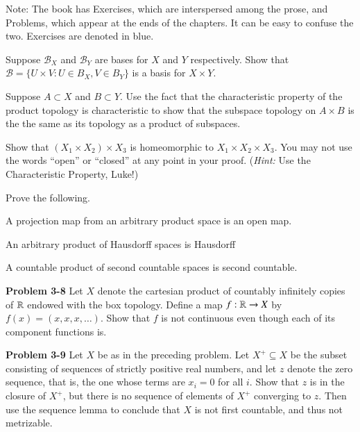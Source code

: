 \documentclass[minion]{homework651}
\begin{document}
Note: The book has Exercises, which are interspersed among the
prose, and Problems, which appear at the ends of the chapters.
It can be easy to confuse the two.  Exercises are denoted in blue.


\begin{problems}

\problem Suppose $\mathcal B_X$ and $\mathcal B_Y$ are bases for $X$ and $Y$ respectively.
Show that $\mathcal B = \{U\times V: U\in B_X, V\in B_Y\}$ is a basis for $X\times Y$.

\problem Suppose $A\subset X$ and $B\subset Y$.  Use the fact that
the characteristic property of the product topology is characteristic to
show that the subspace topology on $A\times B$ is the the same as its
topology as a product of subspaces.





\problem Show that $(X_1\times X_2)\times X_3$ is homeomorphic to $X_1\times X_2 \times X_3$.
You may not use the words ``open'' or ``closed'' at any point in your proof.  (\textit{Hint:} Use the Characteristic Property, Luke!)


\problem Prove the following.
\begin{subproblems}

\item A projection map from an arbitrary product space is an open map.

\item An arbitrary product of Hausdorff spaces is Hausdorff

\item A countable product of second countable spaces is second countable.

\end{subproblems}

\problem\textbf{Problem 3-8} Let $X$ denote the cartesian product of countably infinitely copies of $\mathbb R$
endowed with the box topology. Define a map $f: \mathbb R \to X$ by $f(x) = (x, x, x, \dots)$. Show that $f$ is 
not continuous even though each of its component functions is. 

\problem\textbf{Problem 3-9} Let $X$ be as in the preceding problem. Let $X^+\subseteq X$ be the subset consisting of sequences of 
strictly positive real numbers, and let $z$ denote the zero sequence, that is, the one whose terms are $x_i = 0$ for all $i$. 
Show that $z$ is in the closure of $X^+$, but there is no sequence of elements of $X^+$ converging to $z$. Then use the sequence lemma to conclude that $X$
is not first countable, and thus not metrizable.  


\end{problems}
\end{document}
